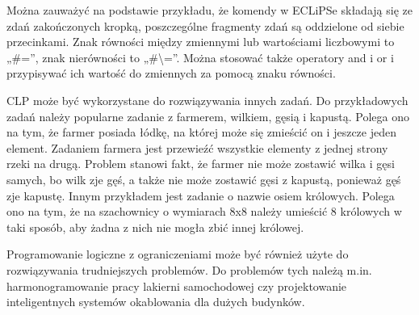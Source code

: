 Można zauważyć na podstawie przykładu, że komendy w ECLiPSe składają się ze zdań zakończonych kropką, poszczególne fragmenty zdań są oddzielone od siebie przecinkami. Znak równości między zmiennymi lub wartościami liczbowymi to „\#=”, znak nierówności to „\#\textbackslash=”. Można stosować także operatory and i or i przypisywać ich wartość do zmiennych za pomocą znaku równości. 

CLP może być wykorzystane do rozwiązywania innych zadań.\cite{niederlinski} Do przykładowych zadań należy popularne zadanie z farmerem, wilkiem, gęsią i kapustą. Polega ono na tym, że farmer posiada łódkę, na której może się zmieścić on i jeszcze jeden element. Zadaniem farmera jest przewieźć wszystkie elementy z jednej strony rzeki na drugą. Problem stanowi fakt, że farmer nie może zostawić wilka i gęsi samych, bo wilk zje gęś, a także nie może zostawić gęsi z kapustą, ponieważ gęś zje kapustę. Innym przykładem jest zadanie o nazwie osiem królowych. Polega ono na tym, że na szachownicy o wymiarach 8x8 należy umieścić 8 królowych w taki sposób, aby żadna z nich nie mogła zbić innej królowej.

Programowanie logiczne z ograniczeniami może być również użyte do rozwiązywania trudniejszych problemów. Do problemów tych należą m.in. harmonogramowanie pracy lakierni samochodowej czy projektowanie inteligentnych systemów okablowania dla dużych budynków.
